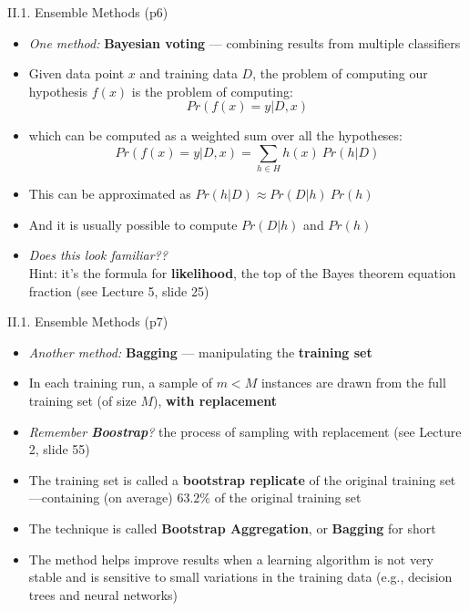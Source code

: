 \documentclass[handout]{beamer}
\newcommand{\strong}[1]{\textbf{\color{teal} #1}}
\newcommand{\stronger}[1]{\textbf{\color{purple} #1}}
\begin{document}
\begin{frame}{II.1. Ensemble Methods (p6)}
\begin{itemize}
\item[] \emph{One method:} \stronger{Bayesian voting} --- 
combining results from multiple classifiers
\item Given data point $x$ and training data $D$, the problem of computing our hypothesis $f(x)$ is the problem of computing:
\[
	Pr(f(x)=y|D,x)
\]
\item[] which can be computed as a weighted sum over all the hypotheses:
\[
	Pr(f(x)=y|D,x) = \sum_{h \in H}{ h(x) ~ Pr(h|D) }
\]
\item This can be approximated as $Pr(h|D) \approx Pr(D|h)~Pr(h)$
\item And it is usually possible to compute $Pr(D|h)$ and $Pr(h)$
\item \emph{Does this look familiar??}\\
Hint: it's the formula for \textbf{likelihood}, the top of the Bayes theorem equation fraction (see Lecture 5, slide 25)
\end{itemize}
\end{frame}
\begin{frame}{II.1. Ensemble Methods (p7)}
\begin{itemize}
\item[]  \emph{Another method:} \stronger{Bagging} ---
manipulating the \strong{training set}
\item In each training run, a sample of $m<M$ instances are drawn from the full training set (of size $M$), \strong{with replacement}
\item \emph{Remember \textbf{Boostrap}?} the process of sampling with replacement
(see Lecture 2, slide 55)
\item The training set is called a \strong{bootstrap replicate} of the original training set---containing (on average) $63.2\%$ of the original training set
\item The technique is called \stronger{Bootstrap Aggregation}, or \stronger{Bagging} for short
\item The method helps improve results when a learning algorithm is not very stable and is sensitive to small variations in the training data (e.g., decision trees and neural networks)
\end{itemize}
\end{frame}
\end{document}
